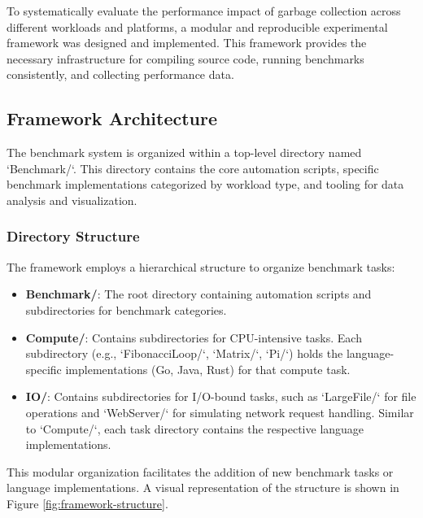To systematically evaluate the performance impact of garbage collection across different workloads and platforms, a modular and reproducible experimental framework was designed and implemented. This framework provides the necessary infrastructure for compiling source code, running benchmarks consistently, and collecting performance data.

\subsection{Framework Architecture}

The benchmark system is organized within a top-level directory named `Benchmark/`. This directory contains the core automation scripts, specific benchmark implementations categorized by workload type, and tooling for data analysis and visualization.

\subsubsection{Directory Structure}
The framework employs a hierarchical structure to organize benchmark tasks:
\begin{itemize}
    \item \textbf{Benchmark/}: The root directory containing automation scripts and subdirectories for benchmark categories.
    \item \textbf{Compute/}: Contains subdirectories for CPU-intensive tasks. Each subdirectory (e.g., `FibonacciLoop/`, `Matrix/`, `Pi/`) holds the language-specific implementations (Go, Java, Rust) for that compute task.
    \item \textbf{IO/}: Contains subdirectories for I/O-bound tasks, such as `LargeFile/` for file operations and `WebServer/` for simulating network request handling. Similar to `Compute/`, each task directory contains the respective language implementations.
\end{itemize}
This modular organization facilitates the addition of new benchmark tasks or language implementations. A visual representation of the structure is shown in Figure \ref{fig:framework-structure}.

